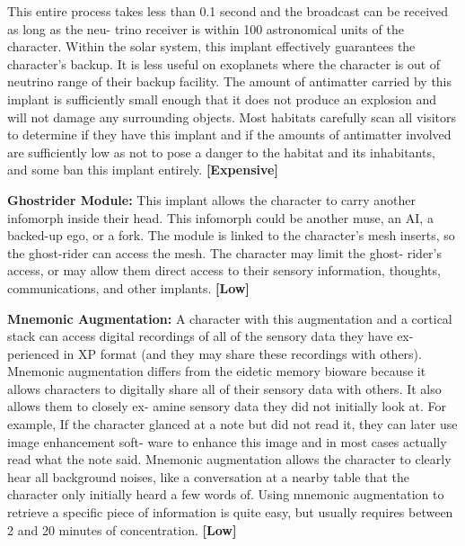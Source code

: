 This entire process takes less than 0.1 second and 
the broadcast can be received as long as the neu-
trino receiver is within 100 astronomical units of 
the character. Within the solar system, this implant 
effectively guarantees the character's backup. It is less 
useful on exoplanets where the character is out of 
neutrino range of their backup facility. The amount 
of antimatter carried by this implant is sufficiently 
small enough that it does not produce an explosion 
and will not damage any surrounding objects. Most 
habitats carefully scan all visitors to determine if they 
have this implant and if the amounts of antimatter 
involved are sufficiently low as not to pose a danger 
to the habitat and its inhabitants, and some ban this 
implant entirely. \textbf{[Expensive]}

\textbf{Ghostrider Module:} This implant allows the 
character to carry another infomorph inside their 
head. This infomorph could be another muse, an AI, 
a backed-up ego, or a fork. The module is linked to 
the character's mesh inserts, so the ghost-rider can 
access the mesh. The character may limit the ghost-
rider's access, or may allow them direct access to their 
sensory information, thoughts, communications, and 
other implants. \textbf{[Low]}

\textbf{Mnemonic Augmentation:} A character with this 
augmentation and a cortical stack can access digital 
recordings of all of the sensory data they have ex-
perienced in XP format (and they may share these 
recordings with others). Mnemonic augmentation 
differs from the eidetic memory bioware because it 
allows characters to digitally share all of their sensory 
data with others. It also allows them to closely ex-
amine sensory data they did not initially look at. For 
example, If the character glanced at a note but did not 
read it, they can later use image enhancement soft-
ware to enhance this image and in most cases actually 
read what the note said. Mnemonic augmentation 
allows the character to clearly hear all background 
noises, like a conversation at a nearby table that the 
character only initially heard a few words of. Using 
mnemonic augmentation to retrieve a specific piece of 
information is quite easy, but usually requires between 
2 and 20 minutes of concentration. \textbf{[Low]}

